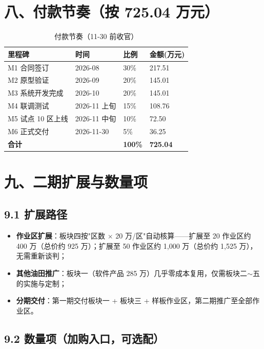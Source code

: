 \documentclass[11pt,a4paper]{ctexart}
\begin{document}
\section{八、付款节奏（按 725.04 万元）}

\begin{table}[H]\centering
\caption{付款节奏（11-30 前收官）}
\begin{tabular}{p{3.5cm} p{2.5cm} p{2cm} p{2.5cm}}
\toprule
\textbf{里程碑} & \textbf{时间} & \textbf{比例} & \textbf{金额(万元)} \\
\midrule
M1 合同签订 & 2026-08 & 30\% & 217.51 \\
M2 原型验证 & 2026-09 & 20\% & 145.01 \\
M3 系统开发完成 & 2026-10 & 20\% & 145.01 \\
M4 联调测试 & 2026-11 上旬 & 15\% & 108.76 \\
M5 试点 10 区上线 & 2026-11 中旬 & 10\% & 72.50 \\
M6 正式交付 & 2026-11-30 & 5\% & 36.25 \\
\midrule
\textbf{合计} & & \textbf{100\%} & \textbf{725.04} \\
\bottomrule
\end{tabular}
\end{table}

\section{九、二期扩展与数量项}

\subsection{9.1 扩展路径}

\begin{itemize}[leftmargin=*]
  \item \textbf{作业区扩展}：板块四按"区数 $\times$ 20 万/区"自动核算——扩展至 20 作业区约 400 万（总价约 925 万）；扩展至 50 作业区约 1,000 万（总价约 1,525 万），无需重新谈判；
  \item \textbf{其他油田推广}：板块一（软件产品 285 万）几乎零成本复用，仅需板块二$\sim$五的实施与定制；
  \item \textbf{分期交付}：第一期交付板块一 + 板块三 + 样板作业区，第二期推广至全部作业区。
\end{itemize}

\subsection{9.2 数量项（加购入口，可选配）}
\end{document}
